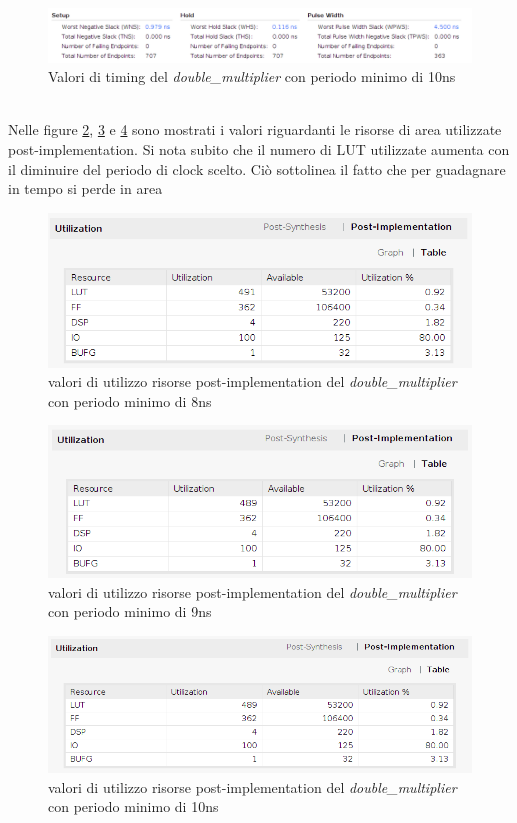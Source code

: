 \documentclass[]{IEEEtran}
\begin{document}
\begin{figure}[!htb]
    \centering
    \includegraphics[width=1.0\linewidth]{figures/10-timing}
    \caption{Valori di timing del \textit{double\_multiplier} con periodo minimo di 10ns}
    \label{fig:TIMING_DM_10}
\end{figure}
\\Nelle figure \ref{fig:UTIL_IMPL_DM_8}, \ref{fig:UTIL_IMPL_DM_9} e \ref{fig:UTIL_IMPL_DM_10} sono mostrati i valori riguardanti le risorse di area utilizzate post-implementation. Si nota subito che il numero di LUT utilizzate aumenta con il diminuire del periodo di clock scelto. Ciò sottolinea il fatto che per guadagnare in tempo si perde in area
\begin{figure}[!htb]
    \centering
    \includegraphics[width=0.9\linewidth]{figures/8-util_impl}
    \caption{valori di utilizzo risorse post-implementation del \textit{double\_multiplier} con periodo minimo di 8ns}
    \label{fig:UTIL_IMPL_DM_8}
\end{figure}
\begin{figure}[!htb]
    \centering
    \includegraphics[width=0.9\linewidth]{figures/9-util_impl}
    \caption{valori di utilizzo risorse post-implementation del \textit{double\_multiplier} con periodo minimo di 9ns}
    \label{fig:UTIL_IMPL_DM_9}
\end{figure}
\begin{figure}[!htb]
    \centering
    \includegraphics[width=0.9\linewidth]{figures/10-util_impl}
    \caption{valori di utilizzo risorse post-implementation del \textit{double\_multiplier} con periodo minimo di 10ns}
    \label{fig:UTIL_IMPL_DM_10}
\end{figure}
\end{document}
